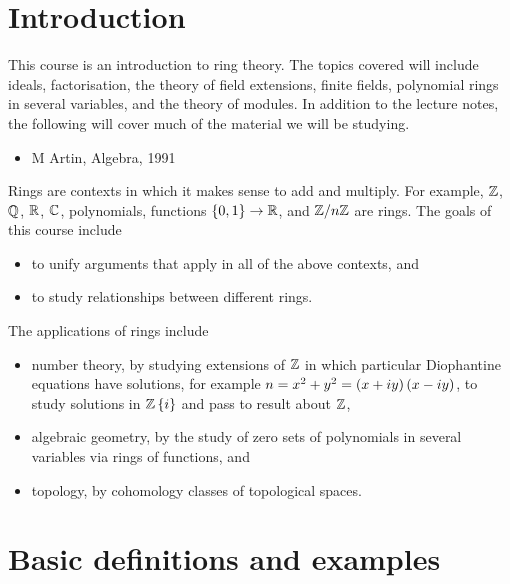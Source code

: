 \def\module{M3P8 Algebra III}
\def\lecturer{Dr David Helm}
\def\term{Autumn 2018}

\def\thm{subsection}







\section{Introduction}


This course is an introduction to ring theory. The topics covered will include ideals, factorisation, the theory of field extensions, finite fields, polynomial rings in several variables, and the theory of modules. In addition to the lecture notes, the following will cover much of the material we will be studying.
\begin{itemize}
\item M Artin, Algebra, 1991
\end{itemize}
Rings are contexts in which it makes sense to add and multiply. For example, $ \mathbb{Z} $, $ \mathbb{Q} $, $ \mathbb{R} $, $ \mathbb{C} $, polynomials, functions $ \left\{ 0, 1 \right\} \to \mathbb{R} $, and $ \mathbb{Z} / n\mathbb{Z} $ are rings. The goals of this course include
\begin{itemize}
\item to unify arguments that apply in all of the above contexts, and
\item to study relationships between different rings.
\end{itemize}
The applications of rings include
\begin{itemize}
\item number theory, by studying extensions of $ \mathbb{Z} $ in which particular Diophantine equations have solutions, for example $ n = x^2 + y^2 = \left( x + iy \right)\left( x - iy \right) $, to study solutions in $ \mathbb{Z}\left\{ i \right\} $ and pass to result about $ \mathbb{Z} $,
\item algebraic geometry, by the study of zero sets of polynomials in several variables via rings of functions, and
\item topology, by cohomology classes of topological spaces.
\end{itemize}

\pagebreak

\section{Basic definitions and examples}

